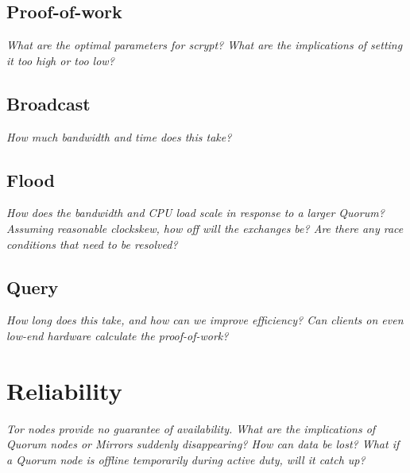 
\subsection{Proof-of-work}

\emph{What are the optimal parameters for scrypt? What are the implications of setting it too high or too low?}

\subsection{Broadcast}

\emph{How much bandwidth and time does this take?}

\subsection{Flood}

\emph{How does the bandwidth and CPU load scale in response to a larger Quorum? Assuming reasonable clockskew, how off will the exchanges be? Are there any race conditions that need to be resolved?}

\subsection{Query}

\emph{How long does this take, and how can we improve efficiency? Can clients on even low-end hardware calculate the proof-of-work?}

\section{Reliability}

\emph{Tor nodes provide no guarantee of availability. What are the implications of Quorum nodes or Mirrors suddenly disappearing? How can data be lost? What if a Quorum node is offline temporarily during active duty, will it catch up?}





